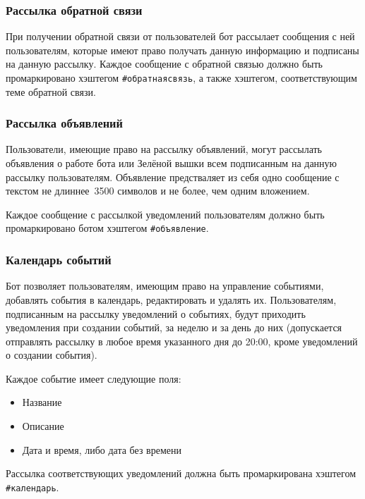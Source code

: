 \subsubsection{Рассылка обратной связи}
    \label{sec:req:fn:feedbacknl}
    При получении обратной связи от пользователей бот рассылает сообщения с ней пользователям,
    которые имеют право получать данную информацию и подписаны на данную рассылку.
    Каждое сообщение с обратной связью должно быть промаркировано хэштегом \hbox{\texttt{\#обратнаясвязь}},
    а также хэштегом, соответствующим теме обратной связи.

\subsubsection{Рассылка объявлений}
    \label{sec:req:fn:announce}
    Пользователи, имеющие право на рассылку объявлений, могут
    рассылать объявления о работе бота или Зелёной вышки всем подписанным на данную рассылку
    пользователям. Объявление предстваляет из себя одно сообщение с текстом не длиннее~3500 символов
    и не более, чем одним вложением.

    Каждое сообщение с рассылкой уведомлений пользователям должно быть промаркировано ботом хэштегом
    \hbox{\texttt{\#объявление}}.

\subsubsection{Календарь событий}
    \label{sec:req:fn:calendar}
    Бот позволяет пользователям, имеющим право на управление событиями, добавлять события в календарь,
    редактировать и удалять их. Пользователям, подписанным на рассылку уведомлений о событиях,
    будут приходить уведомления при создании событий, за неделю и за день до них (допускается отправлять
    рассылку в любое время указанного дня до 20:00, кроме уведомлений о создании события).

    Каждое событие имеет следующие поля:
    \begin{itemize}
        \item
            Название
        \item
            Описание
        \item
            Дата и время, либо дата без времени
    \end{itemize}

    Рассылка соответствующих уведомлений должна быть промаркирована хэштегом \hbox{\texttt{\#календарь}}.

